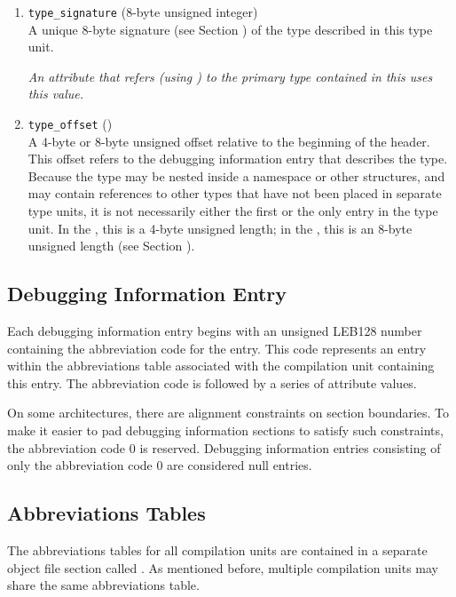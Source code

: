 \begin{enumerate}[1. ]
\item \texttt{type\_signature} (8-byte unsigned integer) \\
A unique 8-byte signature (see Section 
)
of the type described in this type
unit.  

\textit{An attribute that refers (using 
\DWFORMrefsigeight{}) to
the primary type contained in this 
 uses this value.}

\item \texttt{type\_offset} () \\
A 4-byte or 8-byte unsigned offset 
relative to the beginning
of the  header.
This offset refers to the debugging
information entry that describes the type. Because the type
may be nested inside a namespace or other structures, and may
contain references to other types that have not been placed in
separate type units, it is not necessarily either the first or
the only entry in the type unit. In the \thirtytwobitdwarfformat,
this is a 4-byte unsigned length; in the \sixtyfourbitdwarfformat,
this is an 8-byte unsigned length
(see Section ).

\end{enumerate}

\subsection{Debugging Information Entry}
\label{datarep:debugginginformationentry}

Each debugging information entry begins with an 
unsigned LEB128
number containing the abbreviation code for the entry. This
code represents an entry within the abbreviations table
associated with the compilation unit containing this entry. The
abbreviation code is followed by a series of attribute values.

On some architectures, there are alignment constraints on
section boundaries. To make it easier to pad debugging
information sections to satisfy such constraints, the
abbreviation code 0 is reserved. Debugging information entries
consisting of only the abbreviation code 0 are considered
null entries.

\subsection{Abbreviations Tables}
\label{datarep:abbreviationstables}
The abbreviations tables for all compilation units
are contained in a separate object file section called
\dotdebugabbrev{}.
As mentioned before, multiple compilation
units may share the same abbreviations table.

